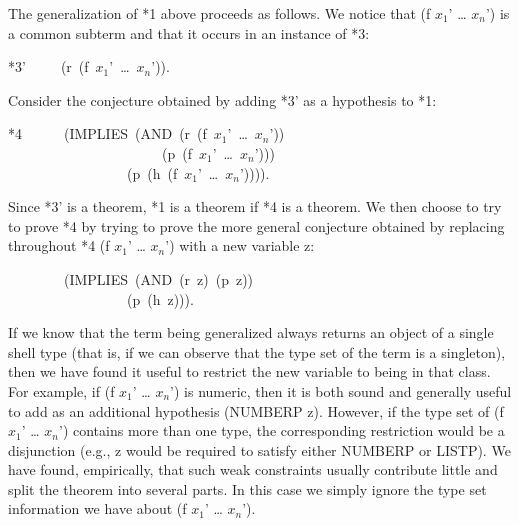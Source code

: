 \documentclass[11pt]{book}
\newenvironment{pubasis}{\begin{flushleft}\ttfamily\small}{\normalsize\rmfamily\end{flushleft}}
\begin{document}
The generalization of *1 above proceeds as follows.
We notice that (f $x_{1}$' \ldots{} $x_{n}$') is a common subterm and that
it occurs in an instance of *3:
\begin{pubasis}
*3'~~~~~(r~(f~$x_{1}$'~\ldots{}~$x_{n}$')).\\
\end{pubasis}
Consider the conjecture obtained by adding *3' as a
hypothesis to *1:
\begin{pubasis}
*4~~~~~~(IMPLIES~(AND~(r~(f~$x_{1}$'~\ldots{}~$x_{n}$'))\\
~~~~~~~~~~~~~~~~~~~~~~(p~(f~$x_{1}$'~\ldots{}~$x_{n}$')))\\
~~~~~~~~~~~~~~~~~(p~(h~(f~$x_{1}$'~\ldots{}~$x_{n}$')))).\\
\end{pubasis}
Since *3' is a theorem, *1 is a theorem if *4 is
a theorem.  We then choose to try to prove *4 by trying
to prove the more
general conjecture obtained by replacing throughout
*4 (f $x_{1}$' \ldots{} $x_{n}$') with a new variable z:
\begin{pubasis}
~~~~~~~~(IMPLIES~(AND~(r~z)~(p~z))\\
~~~~~~~~~~~~~~~~~(p~(h~z))).\\
\end{pubasis}
If we know that the term being generalized always
returns an object of a single shell type (that is, if we can observe
that the type set of the term is a singleton), then we have found it
useful to restrict the new variable to being in that class.
For example, if (f $x_{1}$' \ldots{} $x_{n}$') is numeric,
then it is both sound and generally useful to add as an additional
hypothesis (NUMBERP z).  However, if the type set of
(f $x_{1}$' \ldots{} $x_{n}$') contains more than one type,
the corresponding restriction would be a disjunction
(e.g., z would be  required
to satisfy either NUMBERP or LISTP).
We have found, empirically, that such weak constraints usually contribute little
and  split the theorem into several parts.  In this case we
simply ignore the type set information we have about (f $x_{1}$' \ldots{} $x_{n}$').
\end{document}

